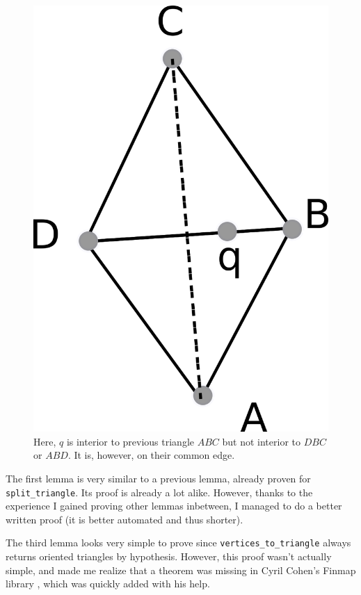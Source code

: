 \documentclass[a4paper,10pt]{article}
\begin{document}
\begin{figure}
  \centering
  \includegraphics[scale=2]{flip_edge_nci}
    \caption{\label{fenci} Here, $q$ is interior to previous triangle $ABC$ but not interior to $DBC$ or $ABD$. It is, however, on their common edge.}
\end{figure}


The first lemma is very similar to a previous lemma, already proven for {\tt split\_triangle}. Its proof is already a lot alike. However, thanks to the experience I gained proving other lemmas inbetween, I managed to do a better written proof (it is better automated and thus shorter).

The third lemma looks very simple to prove since {\tt vertices\_to\_triangle} always returns oriented triangles by hypothesis. However, this proof wasn't actually simple, and made me realize that a theorem was missing in Cyril Cohen's {\sc Finmap} library \cite{finmap}, which was quickly added with his help.
\end{document}
